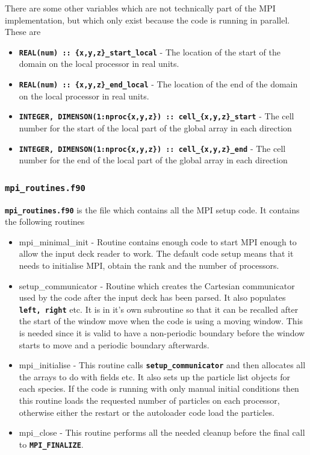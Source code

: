 \documentclass[12pt,a4paper]{article}
\newcommand{\inlinecode}[1]{{\color{warwickred} \bf\texttt{#1}}}
\newcommand{\EPOCH}{{\color{warwickdark}\fontfamily{phv}\selectfont{EPOCH}}}
\begin{document}
There are some other variables which are not technically part of the MPI
implementation, but which only exist because the code is running in
parallel. These are
\begin{itemize}
\item \inlinecode{REAL(num) :: \{x,y,z\}\_start\_local} - The location of the
  start of the domain on the local processor in real units.
\item \inlinecode{REAL(num) :: \{x,y,z\}\_end\_local} - The location of the end
  of the domain on the local processor in real units.
\item \inlinecode{INTEGER, DIMENSON(1:nproc\{x,y,z\}) ::
    cell\_\{x,y,z\}\_start} - The cell number for the start of the local part
  of the global array in each direction
\item \inlinecode{INTEGER, DIMENSON(1:nproc\{x,y,z\}) :: cell\_\{x,y,z\}\_end}
  - The cell number for the end of the local part of the global array in each
  direction
\end{itemize}

\subsubsection{\inlinecode{mpi\_routines.f90}}
\inlinecode{mpi\_routines.f90} is the file which contains all the MPI setup
code. It contains the following routines
\begin{itemize}
\item mpi\_minimal\_init - Routine contains enough code to start MPI enough to
  allow the input deck reader to work. The default {\EPOCH} code setup means that
  it needs to initialise MPI, obtain the rank and the number of processors.
\item setup\_communicator - Routine which creates the Cartesian communicator
  used by the code after the input deck has been parsed. It also populates
  \inlinecode{left, right} etc. It is in it's own subroutine so that it can be
  recalled after the start of the window move when the code is using a moving
  window. This is needed since it is valid to have a non-periodic boundary
  before the window starts to move and a periodic boundary afterwards.
\item mpi\_initialise - This routine calls \inlinecode{setup\_communicator} and
  then allocates all the arrays to do with fields etc. It also sets up the
  particle list objects for each species. If the code is running with only
  manual initial conditions then this routine loads the requested number of
  particles on each processor, otherwise either the restart or the autoloader
  code load the particles.
\item mpi\_close - This routine performs all the needed cleanup before the
  final call to \inlinecode{MPI\_FINALIZE}.
\end{itemize}
\end{document}
